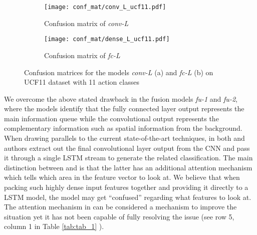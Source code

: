 \documentclass[10pt,twocolumn,letterpaper]{article}
\begin{document}
%  
  
  
  \begin{figure}[t!]
    \centering
     \begin{subfigure}{.9\columnwidth}
      	  \texttt{[image: conf\_mat/conv\_L\_ucf11.pdf]} %
       	 \caption{Confusion matrix of \textit{conv-L}}
    \end{subfigure}
    \begin{subfigure}{.9\columnwidth}
        \texttt{[image: conf\_mat/dense\_L\_ucf11.pdf]}
        \caption{Confusion matrix of \textit{fc-L}}
     \end{subfigure}
     \vspace{-2 mm}
     \caption{Confusion matrices for the models \textit{conv-L} (a) and \textit{fc-L} (b) on UCF11 dataset with 11 action classes } 
     \label{fig:conf_mat_fortwo}
     \vspace{-5 mm}
    \end{figure}


We overcome the above stated drawback in the fusion models \textit{fu-1} and \textit{fu-2}, where the  models identify that the fully connected layer output represents the main information queue while the convolutional output represents the complementary information such as spatial information from the background. %
When drawing parallels to the current state-of-the-art techniques, in both \cite{Baccouche2011} and \cite{Sharma2015} authors extract out the final convolutional layer output from the CNN and pass it through a single LSTM stream to generate the related classification. The main distinction between \cite{Baccouche2011} and \cite{Sharma2015} is that the latter has an additional attention mechanism which tells which area in the feature vector to look at. We believe that when packing such highly dense input features together and providing it directly to a LSTM model, the model may get ``confused'' regarding what features to look at. The attention mechanism in \cite{Sharma2015} can be considered a mechanism to improve the situation yet it has not been capable of fully resolving the issue (see row 5, column 1 in Table \ref{tab:tab_1} ). \par
\end{document}
